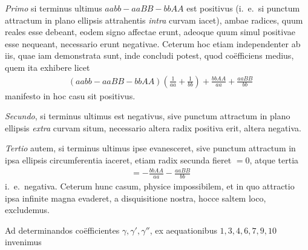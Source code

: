 \textit{Primo} si terminus ultimus \(aabb-aaBB-bbAA\) est positivus (i.\ e.\ si
punctum attractum in plano ellipsis attrahentis \textit{intra} curvam iacet), ambae radices, quum reales esse debeant, eodem signo affectae erunt, adeoque quum simul
positivae esse nequeant, necessario erunt negativae. Ceterum hoc etiam independenter ab iis, quae iam demonstrata sunt, inde concludi potest, quod co\"efficiens medius, quem ita exhibere licet
\[
\begin{aligned}
&(aabb-aaBB-bbAA)\left(\frac1{aa}+\frac1{bb}\right)+\frac{bbAA}{aa}+\frac{aaBB}{bb}
\end{aligned}
\]
manifesto in hoc casu sit positivus.

\textit{Secundo}, si terminus ultimus est negativus, sive punctum attractum in plano
ellipsis \textit{extra} curvam situm, necessario altera radix positiva erit, altera negativa.

\textit{Tertio} autem, si terminus ultimus ipse evanesceret, sive punctum attractum
in ipsa ellipsis circumferentia iaceret, etiam radix secunda fieret \(=0\), atque tertia
\[
\begin{aligned}
&=-\frac{bbAA}{aa}-\frac{aaBB}{bb}
\end{aligned}
\]
i.\ e.\ negativa. Ceterum hunc casum, physice impossibilem, et in quo attractio
ipsa infinite magna evaderet, a disquisitione nostra, hocce saltem loco, excludemus.


Ad determinandos co\"efficientes \(\gamma,\gamma',\gamma''\), ex aequationibus \(1,3,4,6,7,9,10\)
invenimus 
